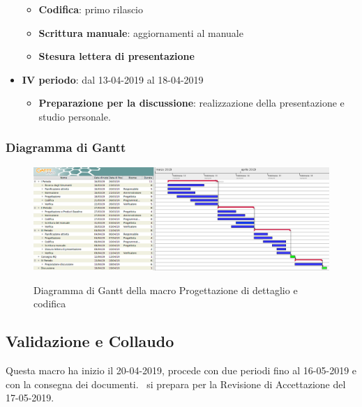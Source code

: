 \begin{itemize}
\begin{itemize}
    	        \item \textbf{Codifica}: primo rilascio
    	        \item \textbf{Scrittura manuale}: aggiornamenti al manuale
    	        \item \textbf{Stesura lettera di presentazione}
        	\end{itemize}
        	\item \textbf{IV periodo}: dal 13-04-2019 al 18-04-2019
			\begin{itemize}
				\item \textbf{Preparazione per la discussione}: realizzazione della presentazione e studio personale.
        	\end{itemize}
        \end{itemize}

        \begin{landscape}
			\subsubsection{Diagramma di Gantt}        
			\begin{figure}[H]
					\centering
					\includegraphics[scale=0.44]{img/Progettazione_di_dettaglio_e_codifica.png}\\
					\caption{Diagramma di Gantt della macro Progettazione di dettaglio e codifica}
			\end{figure}
		\end{landscape}
		\newpage

        \subsection{Validazione e Collaudo}
        Questa macro ha inizio il 20-04-2019, procede con due periodi fino al 16-05-2019 e con la consegna dei documenti. \gruppo\ si
        prepara per la Revisione di Accettazione del 17-05-2019.
        
